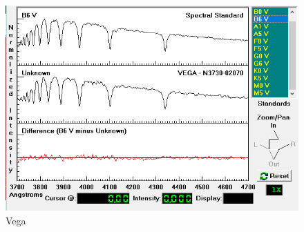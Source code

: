 \documentclass[letterpaper,11pt]{report}
\begin{document}
    \begin{figure}[H]
        \centering
        \includegraphics[scale=0.4]{Vega.png}
        \caption{Vega}
        \label{fig:my_label}
    \end{figure}
    
\end{document}
